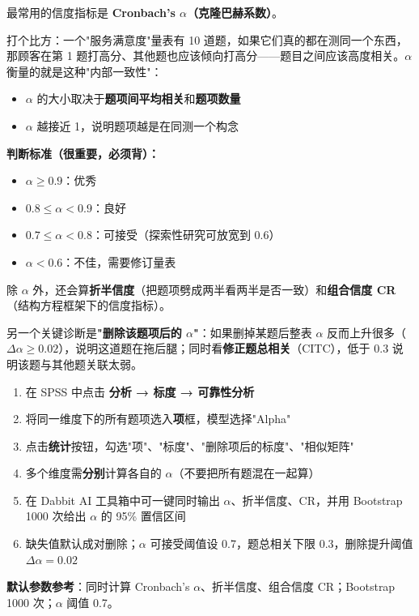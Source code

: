 \begin{algoprinciple}
最常用的信度指标是 \textbf{Cronbach's $\alpha$（克隆巴赫系数）}。

打个比方：一个"服务满意度"量表有 10 道题，如果它们真的都在测同一个东西，那顾客在第 1 题打高分、其他题也应该倾向打高分——题目之间应该高度相关。$\alpha$ 衡量的就是这种"内部一致性"：

\begin{itemize}
    \item $\alpha$ 的大小取决于\textbf{题项间平均相关}和\textbf{题项数量}
    \item $\alpha$ 越接近 1，说明题项越是在同测一个构念
\end{itemize}

\textbf{判断标准（很重要，必须背）：}
\begin{itemize}
    \item $\alpha \geq 0.9$：优秀
    \item $0.8 \leq \alpha < 0.9$：良好
    \item $0.7 \leq \alpha < 0.8$：可接受（探索性研究可放宽到 0.6）
    \item $\alpha < 0.6$：不佳，需要修订量表
\end{itemize}

除 $\alpha$ 外，还会算\textbf{折半信度}（把题项劈成两半看两半是否一致）和\textbf{组合信度 CR}（结构方程框架下的信度指标）。

另一个关键诊断是\textbf{"删除该题项后的 $\alpha$"}：如果删掉某题后整表 $\alpha$ 反而上升很多（$\Delta\alpha \geq 0.02$），说明这道题在拖后腿；同时看\textbf{修正题总相关}（CITC），低于 0.3 说明该题与其他题关联太弱。
\end{algoprinciple}

\begin{algosposs}
\begin{enumerate}
    \item 在 SPSS 中点击 \textbf{分析 → 标度 → 可靠性分析}
    \item 将同一维度下的所有题项选入\textbf{项}框，模型选择"Alpha"
    \item 点击\textbf{统计}按钮，勾选"项"、"标度"、"删除项后的标度"、"相似矩阵"
    \item 多个维度需\textbf{分别}计算各自的 $\alpha$（不要把所有题混在一起算）
    \item 在 Dabbit AI 工具箱中可一键同时输出 $\alpha$、折半信度、CR，并用 Bootstrap 1000 次给出 $\alpha$ 的 95\% 置信区间
    \item 缺失值默认成对删除；$\alpha$ 可接受阈值设 0.7，题总相关下限 0.3，删除提升阈值 $\Delta\alpha=0.02$
\end{enumerate}

\textbf{默认参数参考}：同时计算 Cronbach's $\alpha$、折半信度、组合信度 CR；Bootstrap 1000 次；$\alpha$ 阈值 0.7。
\end{algosposs}

